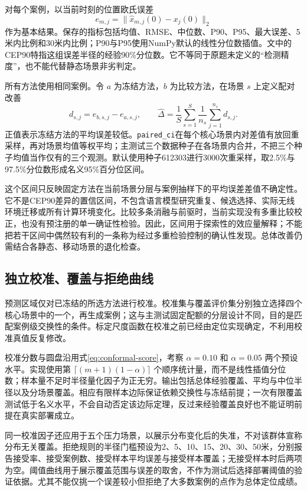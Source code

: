 对每个案例，以当前时刻的位置欧氏误差
\begin{equation}
 e_{m,j}=\|\widehat x_{m,j}(0)-x_j(0)\|_2
\end{equation}
作为基本结果。保存的指标包括均值、RMSE、中位数、P90、P95、最大误差、5米内比例和30米内比例；P90与P95使用NumPy默认的线性分位数插值。文中的CEP90特指这组误差半径的经验90\%分位数。它不等同于原题未定义的“检测精度”，也不能代替静态场景非劣判定。

所有方法使用相同案例。令 $a$ 为冻结方法，$b$ 为比较方法，在场景 $s$ 上定义配对改善
\begin{equation}
 d_{s,j}=e_{b,s,j}-e_{a,s,j},\qquad
 \widehat\Delta=\frac1S\sum_{s=1}^{S}\frac1{n_s}
 \sum_{j=1}^{n_s}d_{s,j}.
 \label{eq:paired-macro-improvement}
\end{equation}
正值表示冻结方法的平均误差较低。\texttt{paired\_ci}在每个核心场景内对差值有放回重采样，再对场景均值等权平均；主测试三个数据种子在各场景内合并，不把三个种子均值当作仅有的三个观测。默认使用种子612303进行3000次重采样，取2.5\%与97.5\%分位数形成名义95\%百分位区间。

这个区间只反映固定方法在当前场景分层与案例抽样下的平均误差差值不确定性。它不是CEP90差异的置信区间，不包含语言模型研究重复、候选选择、实际无线环境迁移或所有计算环境变化。比较多条消融与前驱时，当前实现没有多重比较校正，也没有预注册的单一确证性检验。因此，区间用于探索性的效应量解释；不能把若干区间中偶然较有利的一条称为经过多重检验控制的确认性发现。总体改善仍需结合各静态、移动场景的退化检查。

\subsection{独立校准、覆盖与拒绝曲线}

预测区域仅对已冻结的所选方法进行校准。校准集与覆盖评价集分别独立选择四个核心场景中的一个，再生成案例；这与主测试固定配额的分层设计不同，目的是匹配案例级交换性的条件。标定尺度函数在校准之前已经由定位实现确定，不利用校准真值反复修改。

校准分数与圆盘沿用式\eqref{eq:conformal-score}，考察 $\alpha=0.10$ 和 $\alpha=0.05$ 两个预设水平。实现使用第 $\lceil(m+1)(1-\alpha)\rceil$ 个顺序统计量，而不是线性插值分位数；样本量不足时半径量化因子为正无穷。输出包括总体经验覆盖、平均与中位半径以及分场景覆盖。相应有限样本边际保证依赖交换性与冻结前提\cite{lei2018distributionfree}；一次有限覆盖测试低于名义水平，不会自动否定该边际定理，反过来经验覆盖良好也不能证明前提在真实部署成立。

同一校准因子还应用于五个压力场景，以展示分布变化后的失准，不对该群体宣称分布无关覆盖。拒绝规则的半径门槛预设为2、5、10、15、20、30、50米，分别报告接受率、接受案例数、接受样本平均误差与接受样本覆盖；无接受样本时后两项为空。阈值曲线用于展示覆盖范围与误差的取舍，不作为测试后选择部署阈值的验证依据。尤其不能仅挑一个误差较小但拒绝了大多数案例的点作为总体定位成绩。


